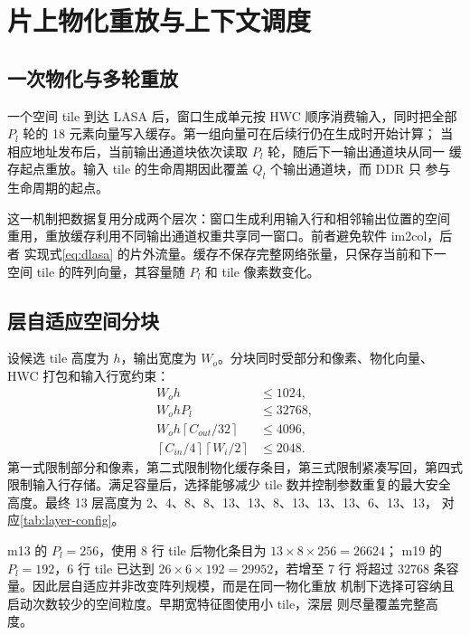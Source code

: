 \section{片上物化重放与上下文调度}
\label{sec:materialize}

\subsection{一次物化与多轮重放}

一个空间 tile 到达 LASA 后，窗口生成单元按 HWC 顺序消费输入，同时把全部
$P_l$ 轮的 18 元素向量写入缓存。第一组向量可在后续行仍在生成时开始计算；
当相应地址发布后，当前输出通道块依次读取 $P_l$ 轮，随后下一输出通道块从同一
缓存起点重放。输入 tile 的生命周期因此覆盖 $Q_l$ 个输出通道块，而 DDR 只
参与生命周期的起点。

这一机制把数据复用分成两个层次：窗口生成利用输入行和相邻输出位置的空间
重用，重放缓存利用不同输出通道权重共享同一窗口。前者避免软件 im2col，后者
实现式\eqref{eq:dlasa} 的片外流量。缓存不保存完整网络张量，只保存当前和下一
空间 tile 的阵列向量，其容量随 $P_l$ 和 tile 像素数变化。

\subsection{层自适应空间分块}

设候选 tile 高度为 $h$，输出宽度为 $W_o$。分块同时受部分和像素、物化向量、
HWC 打包和输入行宽约束：
\begin{align}
W_oh &\le 1024,\label{eq:tile-psum}\\
W_ohP_l &\le 32768,\label{eq:tile-material}\\
W_oh\left\lceil C_{out}/32\right\rceil &\le4096,\label{eq:tile-pack}\\
\left\lceil C_{in}/4\right\rceil\left\lceil W_i/2\right\rceil&\le2048.
\label{eq:tile-line}
\end{align}
第一式限制部分和像素，第二式限制物化缓存条目，第三式限制紧凑写回，第四式
限制输入行存储。满足容量后，选择能够减少 tile 数并控制参数重复的最大安全
高度。最终 13 层高度为 2、4、8、8、13、13、8、13、13、13、6、13、13，
对应\cref{tab:layer-config}。

m13 的 $P_l=256$，使用 8 行 tile 后物化条目为 $13\times8\times256=26624$；
m19 的 $P_l=192$，6 行 tile 已达到 $26\times6\times192=29952$，若增至 7 行
将超过 32768 条容量。因此层自适应并非改变阵列规模，而是在同一物化重放
机制下选择可容纳且启动次数较少的空间粒度。早期宽特征图使用小 tile，深层
则尽量覆盖完整高度。

